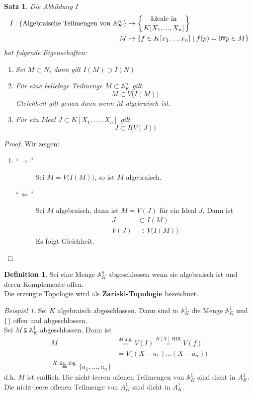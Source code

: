 \documentclass[10pt,a4paper]{article}
\newcommand{\A}{\ensuremath{\mathbb{A}}}
\theoremstyle{plain}
\newtheorem{satz}[theorem]{Satz}
\theoremstyle{definition}
\newtheorem{definition}[theorem]{Definition}
\theoremstyle{remark}
\newtheorem{exm}[theorem]{Beispiel}
\begin{document}
	
	\begin{satz}
		Die Abbildung $I$ 
		\begin{align*}
		I:\left\{\text{Algebraische Teilmengen von $\A^n_K$}\right\}&\to\left\{\text{Ideale in}\atop{K[X_1,...,X_n]}\right\}\\
		M&\mapsto \{f\in K[x_1,...,x_n]\mid f(p)=0\forall p\in M\}
		\end{align*}
		hat folgende Eigenschaften:
		\begin{enumerate}
			\item Sei $M\subset N$, dann gilt $I(M)\supset I(N)$
			\item Für eine beliebige Teilmenge $M\subset \A_K^n$ gilt
			\[M\subset V\big(I(M)\big)\]
			Gleichheit gilt genau dann wenn $M$ algebraisch ist.
			\item Für ein Ideal $J\subset K[X_1,....,X_n]$ gilt
			\[J\subset I\big(V(J)\big)\]
		\end{enumerate}
	\end{satz}
	\begin{proof}
		Wir zeigen:
		\begin{enumerate}
			\item \begin{description}
				\item[\enquote{$\Rightarrow$}] Sei $M=V\big(I(M)\big)$, so ist $M$ algebraisch.
				\item[\enquote{$\Leftarrow$}] Sei $M$ algebraisch, dann ist $M=V(J)$ für ein Ideal $J$. Dann ist
				\begin{align}
				J&\subset I(M)\\
				V(J)&\supset V\big(I(M)\big)
				\end{align}
				Es folgt Gleichheit.
			\end{description}
		\end{enumerate}
	\end{proof}

	\begin{definition}
		Sei eine Menge $\A_K^n$ abgeschlossen wenn sie algebraisch ist und deren Komplemente offen.\\
		Die erzeugte Topologie wird als \textbf{Zariski-Topologie} bezeichnet.
	\end{definition}

	\begin{exm}
		Sei $K$ algebraisch abgeschlossen. Dann sind in $\A_K^1$ die Menge $\A_K^1$ und $\{\}$ offen und abgeschlossen.\\
		Sei $M\subsetneqq\A^1_K$ abgeschlossen. Dann ist
		\begin{align*}
		M&\overset{\text{$M$ alg.}}{=}V(I)\overset{\text{$K[X]$ HIR}}{=}V(f)\\
		&=V\big((X-a_1)...(X-a_n)\big)\\
		\overset{\text{$K$ alg. abg.}}{=}\{a_1,...,a_n\}
		\end{align*}
		d.h. $M$ ist endlich. Die nicht-leeren offenen Teilmengen von $\A_K^1$ sind dicht in $A_K^1$.\\
		Die nicht-leere offenen Teilmenge von $A_K^1$ sind dicht in $A_K^1$.
	\end{exm}
	
\end{document}

